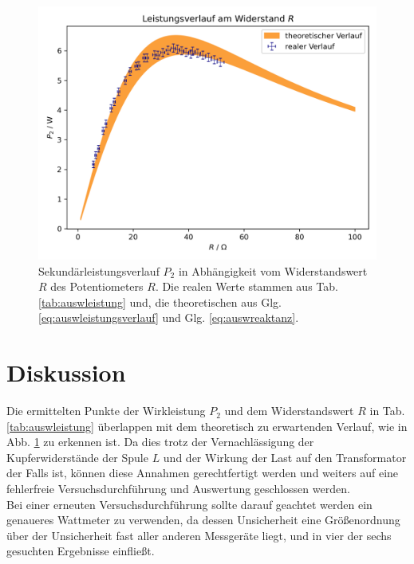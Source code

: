 \documentclass[12pt,a4paper,twoside]{article}
\theoremstyle{definition}
\begin{document}
\begin{figure}[H]
    \centering
    \includegraphics[width=\linewidth]{ausw}
    \caption{Sekundärleistungsverlauf $P_2$ in Abhängigkeit vom Widerstandswert $R$ des Potentiometers $R$. Die realen Werte stammen aus Tab. \ref{tab:auswleistung} und, die theoretischen aus Glg. \ref{eq:auswleistungsverlauf} und Glg. \ref{eq:auswreaktanz}.}
    \label{fig:auswleistung}
\end{figure}



\section{Diskussion}

Die ermittelten Punkte der Wirkleistung $P_2$ und dem Widerstandswert $R$ in Tab. \ref{tab:auswleistung} überlappen mit dem theoretisch zu erwartenden Verlauf, wie in Abb. \ref{fig:auswleistung} zu erkennen ist. Da dies trotz der Vernachlässigung der Kupferwiderstände der Spule $L$ und der Wirkung der Last auf den Transformator der Falls ist, können diese Annahmen gerechtfertigt werden und weiters auf eine fehlerfreie Versuchsdurchführung und Auswertung geschlossen werden. \\

Bei einer erneuten Versuchsdurchführung sollte darauf geachtet werden ein genaueres Wattmeter zu verwenden, da dessen Unsicherheit eine Größenordnung über der Unsicherheit fast aller anderen Messgeräte liegt, und in vier der sechs gesuchten Ergebnisse einfließt.
\end{document}
